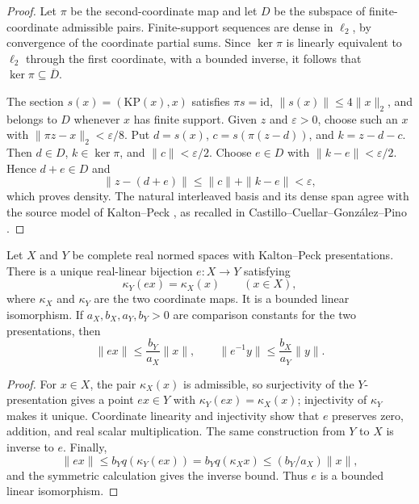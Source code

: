 \begin{proof}
Let $\pi$ be the second-coordinate map and let $D$ be the subspace of finite-coordinate admissible
pairs.  Finite-support sequences are dense in $\ell_2$, by convergence of the coordinate partial
sums.  Since $\ker\pi$ is linearly equivalent to $\ell_2$ through the first coordinate, with a
bounded inverse, it follows that $\ker\pi\subseteq\overline D$.

The section $s(x)=(\mathrm{KP}(x),x)$ satisfies $\pi s=\mathrm{id}$,
$\|s(x)\|\leq4\|x\|_2$, and belongs to $D$ whenever $x$ has finite support.  Given $z$ and
$\varepsilon>0$, choose such an $x$ with
$\|\pi z-x\|_2<\varepsilon/8$.  Put $d=s(x)$,
$c=s(\pi(z-d))$, and $k=z-d-c$.  Then $d\in D$, $k\in\ker\pi$, and
$\|c\|<\varepsilon/2$.  Choose $e\in D$ with $\|k-e\|<\varepsilon/2$.  Hence
$d+e\in D$ and
\[
  \|z-(d+e)\|\leq\|c\|+\|k-e\|<\varepsilon,
\]
which proves density.  The natural interleaved basis and its dense span agree with the source
model of Kalton--Peck \cite[Theorem~4.10]{KP}, as recalled in
Castillo--Cuellar--Gonz\'alez--Pino \cite[\S3]{CCGP}.
\end{proof}

\begin{theorem}\label{thm:presentation-equivalence}
Let $X$ and $Y$ be complete real normed spaces with Kalton--Peck presentations.  There is a unique
real-linear bijection $e:X\to Y$ satisfying
\[
  \kappa_Y(ex)=\kappa_X(x)\qquad(x\in X),
\]
where $\kappa_X$ and $\kappa_Y$ are the two coordinate maps.  It is a bounded linear isomorphism.
If $a_X,b_X,a_Y,b_Y>0$ are comparison constants for the two presentations, then
\[
  \|ex\|\leq \frac{b_Y}{a_X}\|x\|,
  \qquad
  \|e^{-1}y\|\leq \frac{b_X}{a_Y}\|y\|.
\]
\leanok
\end{theorem}

\begin{proof}
For $x\in X$, the pair $\kappa_X(x)$ is admissible, so surjectivity of the $Y$-presentation gives a
point $ex\in Y$ with $\kappa_Y(ex)=\kappa_X(x)$; injectivity of $\kappa_Y$ makes it unique.
Coordinate linearity and injectivity show that $e$ preserves zero, addition, and real scalar
multiplication.  The same construction from $Y$ to $X$ is inverse to $e$.  Finally,
\[
  \|ex\|\leq b_Yq(\kappa_Y(ex))=b_Yq(\kappa_Xx)\leq (b_Y/a_X)\|x\|,
\]
and the symmetric calculation gives the inverse bound.  Thus $e$ is a bounded linear isomorphism.
\end{proof}

